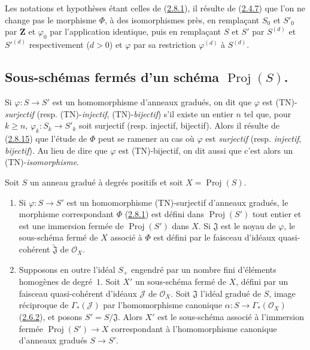 
\begin{env}[2.8.15]
\label{II.2.8.15-fr}
Les notations et hypothèses étant celles de
(\hyperref[II.2.8.1-fr]{2.8.1}), il résulte de
(\hyperref[II.2.4.7-fr]{2.4.7}) que l'on ne change pas le morphisme $\Phi$,
à des isomorphismes près, en remplaçant $S_0$ et $S'_0$ par
$\mathbf{Z}$ et $\varphi_0$ par l'application identique, puis en remplaçant
$S$ et $S'$ par $S^{(d)}$ et ${S'}^{(d)}$ respectivement ($d>0$) et
$\varphi$ par sa restriction $\varphi^{(d)}$ à $S^{(d)}$.
\end{env}

\subsection{Sous-schémas fermés d'un schéma $\operatorname{Proj}(S)$.}
\label{subsection:II.2.9-fr}

\begin{env}[2.9.1]
\label{II.2.9.1-fr}
Si $\varphi:S\to S'$ est un homomorphisme d'anneaux gradués, on dit que
$\varphi$ est (TN)-\emph{surjectif} (resp. (TN)-\emph{injectif},
(TN)-\emph{bijectif}) s'il existe un entier $n$ tel que, pour $k\geq n$,
$\varphi_k:S_k\to S'_k$ soit surjectif (resp. injectif, bijectif). Alors il
résulte de (\hyperref[II.2.8.15-fr]{2.8.15}) que l'étude de $\Phi$ peut se
ramener au cas où $\varphi$ est \emph{surjectif} (resp. \emph{injectif},
\emph{bijectif}). Au lieu de dire que $\varphi$ est (TN)-bijectif, on dit aussi
que c'est alors un (TN)-\emph{isomorphisme}.
\end{env}

\begin{proposition}[2.9.2]
\label{II.2.9.2-fr}
Soit $S$ un anneau gradué à degrés positifs et soit
$X=\operatorname{Proj}(S)$.
\begin{enumerate}
  \item[\rm(i)] Si $\varphi:S\to S'$ est un homomorphisme \textup{(TN)}-surjectif
    d'anneaux gradués, le morphisme correspondant $\Phi$
    \textup{(\hyperref[II.2.8.1-fr]{2.8.1})} est défini dans
    $\operatorname{Proj}(S')$ tout entier et est une immersion fermée de
    $\operatorname{Proj}(S')$ dans $X$. Si $\mathfrak{J}$ est le noyau de
    $\varphi$, le sous-schéma fermé de $X$ associé à $\Phi$ est défini par
    le faisceau d'idéaux quasi-cohérent $\widetilde{\mathfrak{J}}$ de
    $\mathcal{O}_X$.
  \item[\rm(ii)] Supposons en outre l'idéal $S_+$ engendré par un nombre
    fini d'éléments homogènes de degré~$1$. Soit $X'$ un sous-schéma fermé
    de $X$, défini par un faisceau quasi-cohérent d'idéaux $\mathcal{J}$ de
    $\mathcal{O}_X$. Soit $\mathfrak{J}$ l'idéal gradué de $S$, image
    réciproque de $\Gamma_*(\mathcal{J})$ par l'homomorphisme canonique
    $\alpha:S\to\Gamma_*(\mathcal{O}_X)$
    \textup{(\hyperref[II.2.6.2-fr]{2.6.2})}, et posons
    $S'=S/\mathfrak{J}$. Alors $X'$ est le sous-schéma associé à
    l'immersion fermée $\operatorname{Proj}(S')\to X$ correspondant à
    l'homomorphisme canonique d'anneaux gradués $S\to S'$.
\end{enumerate}
\end{proposition}


